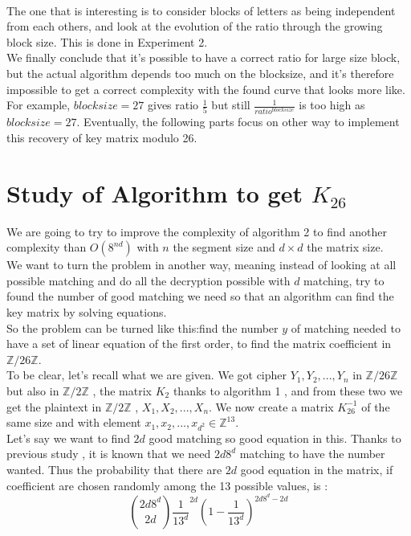 \documentclass{article}
\begin{document}
\\
The one that is interesting is to consider blocks of letters as being independent from each others, and look at the evolution of the ratio through the growing block size. This is done in Experiment 2.\\
We finally conclude that it's possible to have a correct ratio for large size block, but the actual algorithm depends too much on the blocksize, and it's therefore impossible to get a correct complexity with the found curve that looks more like. For example, $blocksize=27$ gives ratio $\frac{1}{5}$ but still $\frac{1}{ratio^{blocksize}}$ is too high as $blocksize = 27$.
Eventually, the following parts focus on other way to implement this recovery of key matrix modulo 26.\\

\section{Study of Algorithm to get $K_{26}$}
We are going to try to improve the complexity of algorithm 2 to find another complexity than $O(8^{nd})$ with $n$ the segment size and $d \times d$ the matrix size.\\
We want to turn the problem in another way, meaning instead of looking at all possible matching and do all the decryption possible with $d$ matching, try to found the number of good matching we need so that an algorithm can find the key matrix by solving equations.\\
So the problem can be turned like this:find the number $y$ of matching needed to have a set of linear equation of the first order, to find the matrix coefficient in $\mathbb{Z}/26\mathbb{Z}$.\\
To be clear, let's recall what we are given. We got cipher $Y_1 , Y_2 , ... , Y_n$ in $\mathbb{Z}/26\mathbb{Z}$ but also in $\mathbb{Z}/2\mathbb{Z}$ , the matrix $K_2$ thanks to algorithm 1 , and from these two we get the plaintext in $\mathbb{Z}/2\mathbb{Z}$ , $X_1,X_2,...,X_n$. We now create a matrix $K_{26}^{-1}$ of the same size and with element $x_1 , x_2 , ... , x_{d^2} \in \mathbb{Z}^{13}$.\\
Let's say we want to find $2d$ good matching so good equation in this. Thanks to previous study , it is known that we need $2d8^d$ matching to have the number wanted. Thus the probability that there are $2d$ good equation in the matrix, if coefficient are chosen randomly among the 13 possible values, is : $$ {2d8^d \choose 2d} \frac{1}{13^d}^{2d} (1-\frac{1}{13^d})^{2d8^d - 2d}$$\\
\end{document}
